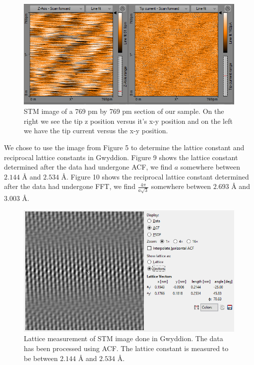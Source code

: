 \documentclass{article}
\begin{document}
\begin{figure}[H]
\includegraphics[scale=.8,center]{STM769Pm2.PNG}
\caption{STM image of a 769 pm by 769 pm section of our sample.  On the right we see the tip z position versus it's x-y position and on the left we have the tip current versus the x-y position.}
\end{figure}


\newpage

We chose to use the image from Figure 5 to determine the lattice constant and reciprocal lattice constants in Gwyddion.  Figure 9 shows the lattice constant determined after the data had undergone ACF, we find $a$ somewhere between $2.144$ {\AA} and $2.534$ {\AA}.  Figure 10 shows the reciprocal lattice constant determined after the data had undergone FFT, we find $\frac{4\pi}{a\sqrt{3}}$ somewhere between $2.693$ {\AA} and $3.003$ {\AA}.  

\begin{figure}[H]
\includegraphics[scale=.8,center]{STMLatticeACF.PNG}
\caption{Lattice measurement of STM image done in Gwyddion.  The data has been processed using ACF.  The lattice constant is measured to be between $2.144$ {\AA} and $2.534$ {\AA}.}
\end{figure}
\end{document}
